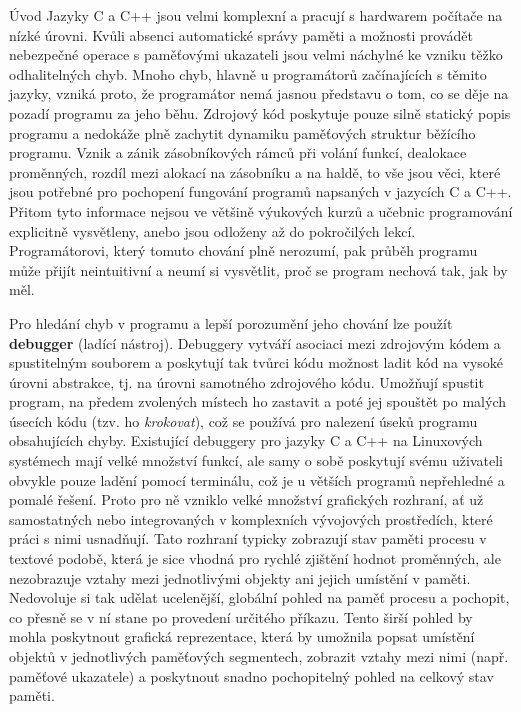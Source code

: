 \documentclass[czech,bachelor,male,python,dept460,hidelinks]{diploma}						%
\newcommand{\parspace}[1][]{
	\ifthenelse{\isempty{#1}}{\vspace{5mm}}{\vspace{#1}}
	\par
}
\begin{document}
\MakeTitlePages

\begin{section}{Úvod}
	Jazyky C a C++ jsou velmi komplexní a pracují s hardwarem počítače na nízké úrovni.
	Kvůli absenci automatické správy paměti a možnosti provádět nebezpečné operace s paměťovými ukazateli jsou velmi náchylné ke vzniku těžko odhalitelných chyb.
	Mnoho chyb, hlavně u programátorů začínajících s těmito jazyky, vzniká proto, že programátor nemá jasnou představu o tom, co se děje na pozadí programu za
	jeho běhu. Zdrojový kód poskytuje pouze silně statický popis programu a nedokáže plně zachytit dynamiku paměťových struktur běžícího programu.
	Vznik a zánik zásobníkových rámců při volání funkcí, dealokace proměnných, rozdíl mezi alokací na zásobníku a na haldě,
	to vše jsou věci, které jsou potřebné pro pochopení fungování programů napsaných v jazycích C a C++. Přitom tyto informace nejsou ve většině výukových kurzů
	a učebnic programování explicitně vysvětleny, anebo jsou odloženy až do pokročilých lekcí. Programátorovi, který tomuto chování plně nerozumí,
	pak průběh programu může přijít neintuitivní a neumí si vysvětlit, proč se program nechová tak, jak by měl.
	
	\parspace Pro hledání chyb v programu a lepší porozumění jeho chování lze použít \textbf{debugger} (ladící nástroj).
	Debuggery vytváří asociaci mezi zdrojovým kódem a spustitelným souborem a poskytují tak tvůrci kódu možnost ladit kód
	na vysoké úrovni abstrakce, tj. na úrovni samotného zdrojového kódu. Umožňují spustit program, na předem zvolených místech ho zastavit a poté jej spouštět
	po malých úsecích kódu (tzv. ho \textit{krokovat}), což se používá pro nalezení úseků programu obsahujících chyby. Existující debuggery pro jazyky C a C++ na
	Linuxových systémech mají velké množství funkcí, ale samy o sobě poskytují svému uživateli obvykle pouze ladění pomocí terminálu, což je u větších programů
	nepřehledné a pomalé řešení. Proto pro ně vzniklo velké množství grafických rozhraní, ať už samostatných nebo integrovaných v komplexních vývojových prostředích,
	které práci s nimi usnadňují. Tato rozhraní typicky zobrazují stav paměti procesu v textové podobě, která je sice vhodná pro rychlé
	zjištění hodnot proměnných, ale nezobrazuje vztahy mezi jednotlivými objekty ani jejich umístění v paměti.
	Nedovoluje si tak udělat ucelenější, globální pohled na paměť procesu a pochopit, co přesně se v ní stane po provedení určitého příkazu.
	Tento širší pohled by mohla poskytnout grafická reprezentace, která by umožnila popsat umístění objektů v jednotlivých paměťových segmentech,
	zobrazit vztahy mezi nimi (např. paměťové ukazatele) a poskytnout snadno pochopitelný pohled na celkový stav paměti.
	

\end{section}
\end{document}

